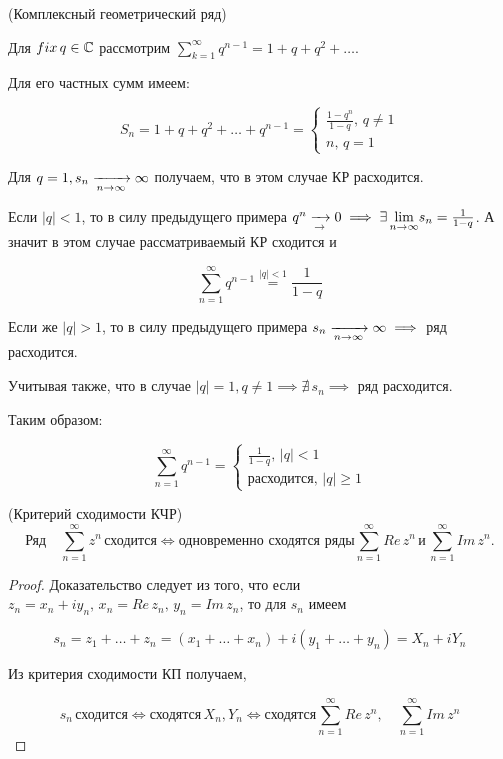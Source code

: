 \documentclass[../../main.tex]{subfiles}
\begin{document}
\begin{exmp}(Комплексный геометрический ряд)
	\;
	
	Для $ fix\, q \in \mathbb{C} $ рассмотрим $ \sum_{k=1}^{\infty}q^{n - 1} = 1 + q + q^2 + \ldots $.
	
	Для его частных сумм имеем:
	
	\[S_n = 1 + q + q^2 + \ldots + q^{n - 1} =
	\begin{cases}
		\frac{1 - q^n}{1 - q},\, q \neq 1 \\
		n,\, q = 1
	\end{cases}\]
	
	Для $ q = 1, s_n \xrightarrow[n \rightarrow \infty]{} \infty $ получаем, что в этом случае КР расходится.
	
	Если $ |q| < 1 $, то в силу предыдущего примера $ q^n \xrightarrow[\rightarrow]{} 0 \implies \exists\, \underset{n \to \infty}{\lim} s_n = \frac{1}{1 - q} $. А значит в этом случае рассматриваемый КР сходится и 
	
	\[\sum_{n=1}^{\infty}q^{n - 1} \stackrel{|q| < 1}{=} \frac{1}{1 - q}\]
	
	Если же $ |q| > 1 $, то в силу предыдущего примера $ s_n \xrightarrow[n \rightarrow \infty]{} \infty \implies $ ряд расходится.
	
	Учитывая также, что в случае $ |q| = 1, q \neq 1 \implies \nexists\, s_n \implies $ ряд расходится.
	
	Таким образом:
	
	\[\sum_{n=1}^{\infty}q^{n - 1} = 
	\begin{cases}
		\frac{1}{1 - q},\, |q| < 1 \\
		\text{расходится},\, |q| \geq 1
	\end{cases}\]
\end{exmp}

\begin{thm}(Критерий сходимости КЧР)
	\[\text{Ряд} \quad \sum_{n=1}^{\infty}z^n\, \text{сходится} \iff \text{одновременно сходятся ряды} \sum_{n=1}^{\infty}Re\,z^n\, \text{и}\, \sum_{n=1}^{\infty}Im\,z^n.\]
\end{thm}
\begin{proof}
	Доказательство следует из того, что если $ z_n = x_n + iy_n,\, x_n = Re\,z_n,\, y_n = Im\,z_n $, то для $ s_n $ имеем
	
	\[s_n = z_1 + \ldots + z_n = (x_1 + \ldots + x_n) + i(y_1 + \ldots + y_n) = X_n + iY_n\]
	
	Из критерия сходимости КП получаем, 
	
	\[ s_n\, \text{сходится} \iff \text{сходятся}\, X_n, Y_n \iff \text{сходятся} \sum_{n=1}^{\infty}Re\,z^n, \quad \sum_{n=1}^{\infty}Im\,z^n \]
	\qedhere
\end{proof}
\end{document}
